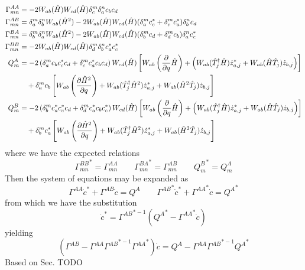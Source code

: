 \documentclass[12pt]{article}
\newcommand{\hc}{^\dagger}
\begin{document}
	\begin{align}
	\Gamma^{AA}_{mn} &= -2W_{ab}(\hat{H})W_{cd}(\hat{H}) \delta_c^m \delta_a^n c_b c_d\\
	\Gamma^{AB}_{mn} &= \delta_a^m \delta_b^n W_{ab}(\hat{H}^2) - 2W_{ab}(\hat{H})W_{cd}(\hat{H})(\delta_a^m  c_c^* + \delta_c^m c_a^*) \delta_b^n c_d\\
	\Gamma^{BA}_{mn} &= \delta_b^m \delta_a^n W_{ab}(\hat{H}^2) - 2W_{ab}(\hat{H}) W_{cd}(\hat{H}) (\delta_b^m c_d + \delta_d^m c_b) \delta_a^n c_c^*\\
	\Gamma^{BB}_{mn} &= -2W_{ab}(\hat{H})W_{cd}(\hat{H}) \delta_d^m \delta_b^n c_a^* c_c^*\\
	Q^A_m &= -2 \left( \delta^m_a c_b c_c^* c_d + \delta^m_c c_a^* c_b c_d \right) W_{cd}(\hat{H}) \left[ W_{ab}\left(\pdv{q}\hat{H}\right) + \left( W_{ab}(\hat{T}_j\hc \hat{H}) \dot{z}_{a,j}^* + W_{ab}(\hat{H} \hat{T}_j) \dot{z}_{b,j} \right) \right] \nonumber\\
	&\quad + \delta^m_a c_b \left[  W_{ab}\left(\pdv{\hat{H}^2}{q}\right) + W_{ab}(\hat{T}_j\hc \hat{H}^2) \dot{z}_{a,j}^* + W_{ab}(\hat{H}^2 \hat{T}_j) \dot{z}_{b,j}\right]\\
	Q^B_m &= -2 \left( \delta^m_b c_a^* c_c^* c_d + \delta^m_d c_a^* c_b c_c^* \right) W_{cd}(\hat{H}) \left[ W_{ab}\left(\pdv{q}\hat{H}\right) + \left( W_{ab}(\hat{T}_j\hc \hat{H}) \dot{z}_{a,j}^* + W_{ab}(\hat{H} \hat{T}_j) \dot{z}_{b,j} \right) \right] \nonumber\\
	&\quad +\delta^m_b c_a^* \left[  W_{ab}\left(\pdv{\hat{H}^2}{q}\right) + W_{ab}(\hat{T}_j\hc \hat{H}^2) \dot{z}_{a,j}^* + W_{ab}(\hat{H}^2 \hat{T}_j) \dot{z}_{b,j}\right]
	\end{align}
	where we have the expected relations
	\begin{equation}
	{\Gamma^{BB}_{mn}}^* = \Gamma^{AA}_{mn} \qquad {\Gamma^{BA}_{mn}}^* = \Gamma^{AB}_{mn} \qquad {Q^B_m}^* = Q^A_m
	\end{equation}
	Then the system of equations may be expanded as
	\begin{equation}
	\Gamma^{AA} \dot{c}^* + \Gamma^{AB} \dot{c} = Q^A \qquad {\Gamma^{AB}}^* \dot{c}^* + {\Gamma^{AA}}^* \dot{c} = {Q^A}^*
	\end{equation}
	from which we have the substitution
	\begin{equation}
	\dot{c}^* = {\Gamma^{AB}}^{*-1} ({Q^A}^* - {\Gamma^{AA}}^* \dot{c})
	\end{equation}
	yielding
	\begin{equation}
	(\Gamma^{AB} - \Gamma^{AA} {\Gamma^{AB}}^{*-1} {\Gamma^{AA}}^*) \dot{c} = Q^A - \Gamma^{AA} {\Gamma^{AB}}^{*-1} {Q^A}^*
	\end{equation}
	Based on Sec. TODO
	
\end{document}

